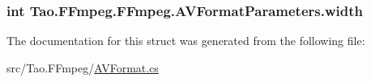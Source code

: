 \label{struct_tao_1_1_f_fmpeg_1_1_f_fmpeg_1_1_a_v_format_parameters_ad9f5705461268d3aec9f066dd6ce968b}
\hypertarget{struct_tao_1_1_f_fmpeg_1_1_f_fmpeg_1_1_a_v_format_parameters_a62366f237d6c966993db5ccf3d8396ea}{
\subsubsection[{width}]{\setlength{\rightskip}{0pt plus 5cm}int {\bf Tao.FFmpeg.FFmpeg.AVFormatParameters.width}}}
\label{struct_tao_1_1_f_fmpeg_1_1_f_fmpeg_1_1_a_v_format_parameters_a62366f237d6c966993db5ccf3d8396ea}


The documentation for this struct was generated from the following file:\begin{DoxyCompactItemize}
\item 
src/Tao.FFmpeg/\hyperlink{_a_v_format_8cs}{AVFormat.cs}\end{DoxyCompactItemize}
